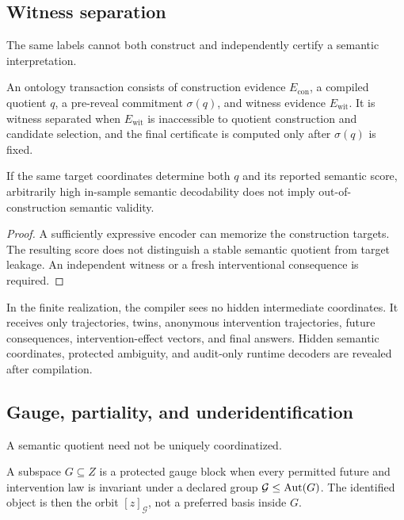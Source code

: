 \subsection{Witness separation}

The same labels cannot both construct and independently certify a semantic interpretation.

\begin{definition}
An ontology transaction consists of construction evidence $E_{\mathrm{con}}$, a compiled quotient $q$, a pre-reveal commitment $\sigma(q)$, and witness evidence $E_{\mathrm{wit}}$.  It is witness separated when $E_{\mathrm{wit}}$ is inaccessible to quotient construction and candidate selection, and the final certificate is computed only after $\sigma(q)$ is fixed.
\end{definition}

\begin{proposition}
If the same target coordinates determine both $q$ and its reported semantic score, arbitrarily high in-sample semantic decodability does not imply out-of-construction semantic validity.
\end{proposition}

\begin{proof}
A sufficiently expressive encoder can memorize the construction targets.  The resulting score does not distinguish a stable semantic quotient from target leakage.  An independent witness or a fresh interventional consequence is required.
\end{proof}

In the finite realization, the compiler sees no hidden intermediate coordinates.  It receives only trajectories, twins, anonymous intervention trajectories, future consequences, intervention-effect vectors, and final answers.  Hidden semantic coordinates, protected ambiguity, and audit-only runtime decoders are revealed after compilation.

\subsection{Gauge, partiality, and underidentification}

A semantic quotient need not be uniquely coordinatized.

\begin{definition}
A subspace $G\subseteq Z$ is a protected gauge block when every permitted future and intervention law is invariant under a declared group $\mathcal G\leq\operatorname{Aut}(G)$.  The identified object is then the orbit $[z]_\mathcal G$, not a preferred basis inside $G$.
\end{definition}

